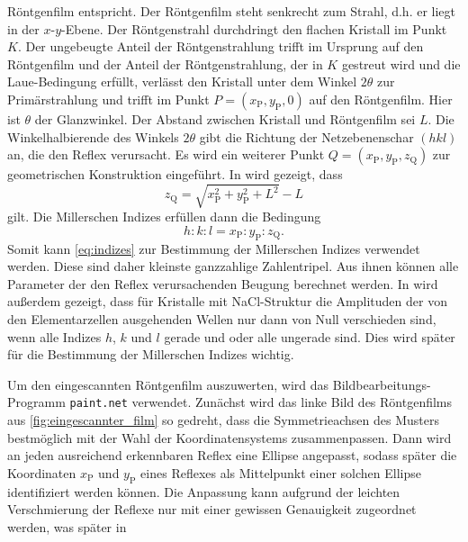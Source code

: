 Röntgenfilm entspricht. Der Röntgenfilm steht senkrecht zum Strahl, d.h. er liegt in der $x$-$y$-Ebene. Der Röntgenstrahl durchdringt den flachen Kristall im Punkt $K$.
Der ungebeugte Anteil der Röntgenstrahlung trifft im Ursprung auf den Röntgenfilm und der Anteil der Röntgenstrahlung, der in $K$ gestreut wird und die Laue-Bedingung
erfüllt, verlässt den Kristall unter dem Winkel $2\theta$ zur Primärstrahlung und trifft im Punkt $P = (x_{\mathrm{P}}, y_{\mathrm{P}}, 0)$ auf den Röntgenfilm. Hier ist
$\theta$ der Glanzwinkel. Der Abstand zwischen Kristall und Röntgenfilm sei $L$. Die Winkelhalbierende des Winkels $2\theta$ gibt die Richtung der Netzebenenschar $(hkl)$ an,
die den Reflex verursacht. Es wird ein weiterer Punkt $Q = (x_{\mathrm{P}}, y_{\mathrm{P}}, z_{\mathrm{Q}})$ zur geometrischen Konstruktion eingeführt.
In \cite{laue_handblatt} wird gezeigt, dass
\begin{equation}\label{eq:koordinate}
    z_{\mathrm{Q}} = \sqrt{x_{\mathrm{P}}^2 + y_{\mathrm{P}}^2 + L^2} - L
\end{equation} gilt. Die Millerschen Indizes erfüllen dann die Bedingung
\begin{equation}\label{eq:indizes}
    h:k:l = x_{\mathrm{P}}:y_{\mathrm{P}}:z_{\mathrm{Q}} . 
\end{equation} Somit kann \cref{eq:indizes} zur Bestimmung der Millerschen Indizes verwendet werden. Diese sind daher kleinste ganzzahlige Zahlentripel.
Aus ihnen können alle Parameter der den Reflex verursachenden Beugung berechnet werden. In \cite{laue_handblatt} wird außerdem gezeigt, dass für Kristalle mit
NaCl-Struktur die Amplituden der von den Elementarzellen ausgehenden Wellen nur dann von Null verschieden sind, wenn alle Indizes $h$, $k$ und $l$ gerade und oder alle ungerade sind.
Dies wird später für die Bestimmung der Millerschen Indizes wichtig.\\ \par
Um den eingescannten Röntgenfilm auszuwerten, wird das Bildbearbeitungs-Programm \texttt{paint.net} verwendet. Zunächst wird das linke Bild des Röntgenfilms aus
\cref{fig:eingescannter_film} so gedreht, dass die Symmetrieachsen des Musters bestmöglich mit der Wahl der Koordinatensystems zusammenpassen. Dann wird an jeden ausreichend
erkennbaren Reflex eine Ellipse angepasst, sodass später die Koordinaten $x_{\mathrm{P}}$ und $y_{\mathrm{P}}$ eines Reflexes als Mittelpunkt einer solchen Ellipse identifiziert
werden können. Die Anpassung kann aufgrund der leichten Verschmierung der Reflexe nur mit einer gewissen Genauigkeit zugeordnet werden, was später in
